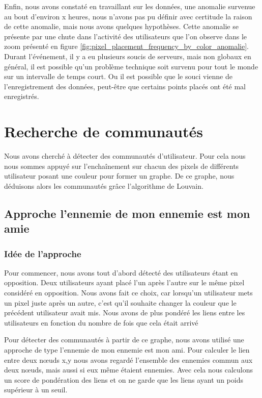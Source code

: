 \documentclass[a4paper]{article}
\begin{document}
{Enfin, nous avons constaté en travaillant sur les données, une anomalie survenue au bout d'environ x heures, nous n'avons pas pu définir avec certitude la raison de cette anomalie, mais nous avons quelques hypothèses. Cette anomalie se présente par une chute dans l'activité des utilisateurs que l'on observe dans le zoom présenté en figure \ref{fig:pixel_placement_frequency_by_color_anomalie}. Durant l'événement, il y a eu plusieurs soucis de serveurs, mais non globaux en général, il est possible qu'un problème technique soit survenu pour tout le monde sur un intervalle de temps court. Ou il est possible que le souci vienne de l'enregistrement des données, peut-être que certains points placés ont été mal enregistrés.



\section{Recherche de communautés}
Nous avons cherché à détecter des communautés d'utilisateur. Pour cela nous nous sommes appuyé sur l’enchaînement sur chacun des pixels de différents utilisateur posant une couleur pour former un graphe. De ce graphe, nous déduisons alors les communautés grâce l'algorithme de Louvain.
\subsection{Approche l'ennemie de mon ennemie est mon amie}

\subsubsection{Idée de l'approche}

 Pour commencer, nous avons tout d'abord détecté des utilisateurs étant en opposition. Deux utilisateurs ayant placé l'un après l'autre sur le même pixel considéré en opposition. Nous avons fait ce choix, car lorsqu'un utilisateur mets un pixel juste après un autre, c'est qu'il souhaite changer la couleur que le précédent utilisateur avait mis. Nous avons de plus pondéré les liens entre les utilisateurs en fonction du nombre de fois que cela était arrivé 

Pour détecter des communautés à partir de ce graphe, nous avons utilisé une approche de type l'ennemie de mon ennemie est mon ami. Pour calculer le lien entre deux nœuds x,y nous avons regardé l'ensemble des ennemies commun aux deux nœuds, mais aussi si eux même étaient ennemies. Avec cela nous calculons un score de pondération des liens et on ne garde que les liens ayant un poids supérieur à un seuil. 

}
\end{document}

